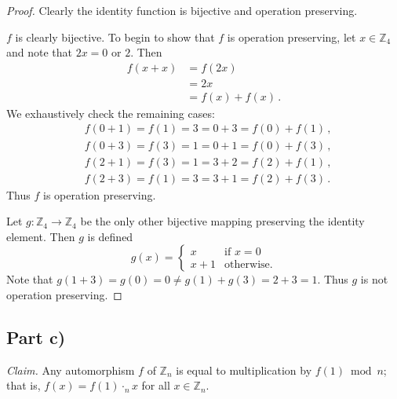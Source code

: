 \documentclass{abrice}
\newcommand{\Z}{\mathbb{Z}}
\newcommand{\Claim}{\emph{Claim.}\xspace}%
\begin{document}
\begin{proof}
  Clearly the identity function is bijective and operation preserving.

  $f$ is clearly bijective. To begin to show that $f$ is operation preserving, let $x \in
  \Z_4$ and note that $2x = 0$ or $2$. Then
  \begin{align*}
    f(x + x)
    &= f(2x) \\
    &= 2x \\
    &= f(x) + f(x)\, .
  \end{align*}
  We exhaustively check the remaining cases:
  \begin{align*}
    &f(0 + 1) = f(1) = 3 = 0 + 3 = f(0) + f(1)\, , \\
    &f(0 + 3) = f(3) = 1 = 0 + 1 = f(0) + f(3)\, , \\
    &f(2 + 1) = f(3) = 1 = 3 + 2 = f(2) + f(1)\, , \\
    &f(2 + 3) = f(1) = 3 = 3 + 1 = f(2) + f(3)\, .
  \end{align*}
  Thus $f$ is operation preserving.

  Let $g : \Z_4 \to \Z_4$ be the only other bijective mapping preserving the
  identity element. Then $g$ is defined
  \[
    g(x) =
    \begin{cases}
      x &\text{if } x = 0 \\
      x + 1 &\text{otherwise.}
    \end{cases}
  \]
  Note that $g(1 + 3) = g(0) = 0 \neq g(1) + g(3) = 2 + 3 = 1$. Thus $g$ is not
  operation preserving.
\end{proof}


\subsection{Part c)}

\Claim Any automorphism $f$ of $\Z_n$ is equal to multiplication by $f(1) \bmod
n$; that is, $f(x) = f(1) \cdot_n x$ for all $x \in \Z_n$.
\end{document}
